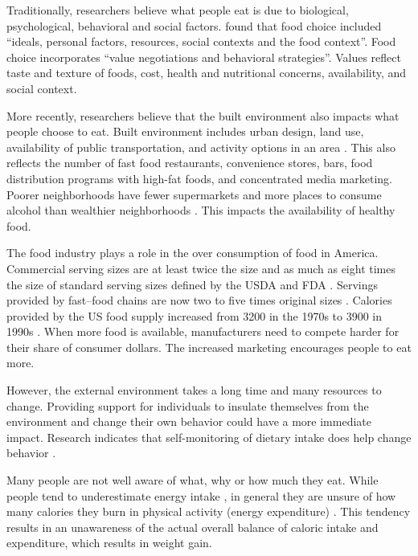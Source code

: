 Traditionally, researchers believe what people eat is due to biological, psychological, behavioral and social factors. \citet{furst_food_1996} found that food choice included ``ideals, personal factors, resources, social contexts and the food context''. Food choice incorporates ``value negotiations and behavioral strategies''. Values reflect taste and texture of foods, cost, health and nutritional concerns, availability, and social context. 

More recently, researchers believe that the built environment also impacts what people choose to eat. Built environment includes urban design, land use, availability of public transportation, and activity options in an area \citep{Booth2005}. This also reflects the number of fast food restaurants, convenience stores, bars, food distribution programs with high-fat foods, and concentrated media marketing. Poorer neighborhoods have fewer supermarkets and more places to consume alcohol than wealthier neighborhoods \citep{Morland2002}. This impacts the availability of healthy food. 

The food industry plays a role in the over consumption of food in America. Commercial serving sizes are at least twice the size and as much as eight times the size of standard serving sizes defined by the USDA and FDA \citep{Young2003, Nielsen2003}. Servings provided by fast--food chains are now two to five times original sizes \citep{Young2003}. Calories provided by the US food supply increased from 3200 in the 1970s to 3900 in 1990s \citep{Nestle2002}. When more food is available, manufacturers need to compete harder for their share of consumer dollars. The increased marketing encourages people to eat more. 

However, the external environment takes a long time and many resources to change. Providing support for individuals to insulate themselves from the environment and change their own behavior could have a more immediate impact.  \citep{Hill2006}
Research indicates that self-monitoring of dietary intake does help change behavior \citep{burke_experiences_2009,burke_self-monitoring_2005, burke_self-monitoring_2011}. 

Many people are not well aware of what, why or how much they eat.   While people tend to underestimate energy intake \citep{Schoeller199518,Black1991583,Livingstone1990}, in general they are unsure of how many calories they burn in physical activity (energy expenditure) \citep{Prince2008}. This tendency results in an unawareness of the actual overall balance of caloric intake and expenditure, which results in weight gain. 

